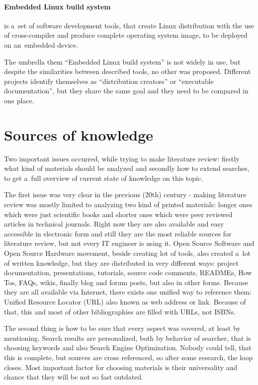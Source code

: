 \documentclass[printmode]{mgr}
\begin{document}
\paragraph{Embedded Linux build system} is a~set of software development tools, that create Linux distribution with the use of cross-compiler and produce complete operating system image, to be deployed on an~embedded device.

The umbrella them ``Embedded Linux build system'' is not widely in use, but despite the similarities between described tools, no other was proposed. Different projects identify themselves as ``distribution creators'' or ``executable documentation'', but they share the same goal and they need to be compared in one place.



\section{Sources of knowledge}
\label{section:sources-of-knowledge}

Two important issues occurred, while trying to make literature review: firstly what kind of materials should be analyzed and secondly how to extend searches, to get a~full overview of current state of knowledge on this topic.

The first issue was very clear in the previous (20th) century - making literature review was mostly limited to analyzing two kind of printed materials: longer ones which were just scientific books and shorter ones which were peer reviewed articles in technical journals.
Right now they are also available and easy accessible in electronic form and still they are the most reliable sources for literature review, but not every IT engineer is using it.
Open Source Software and Open Source Hardware movement, beside creating lot of tools, also created a~lot of written knowledge, but they are distributed in very different ways: project documentation, presentations, tutorials, source code comments, READMEs, How Tos, FAQs, wikis, finally blog and forum posts, but also in other forms.
Because they are all available via Internet, there exists one unified way to reference them: Unified Resource Locator (URL) also known as web address or link.
Because of that, this and most of other bibliographies are filled with URLs, not ISBNs.

The second thing is how to be sure that every aspect was covered, at least by mentioning. Search results are personalized, both by behavior of searcher, that is choosing keywords and also Search Engine Optimization.
Nobody could tell, that this is complete, but sources are cross referenced, so after some research, the loop closes.
Most important factor for choosing materials is their universality and chance that they will be not so fast outdated.
\end{document}
